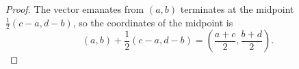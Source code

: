\begin{Exercise}
\begin{proof}
The vector emanates from $(a,b)$ terminates at the midpoint $\frac{1}{2}(c-a,d-b)$, so the coordinates of the midpoint is 
$$
(a,b) + \frac{1}{2}(c-a,d-b) = \left( \frac{a+c}{2}, \frac{b+d}{2} \right).
$$
\end{proof}
\end{Exercise}